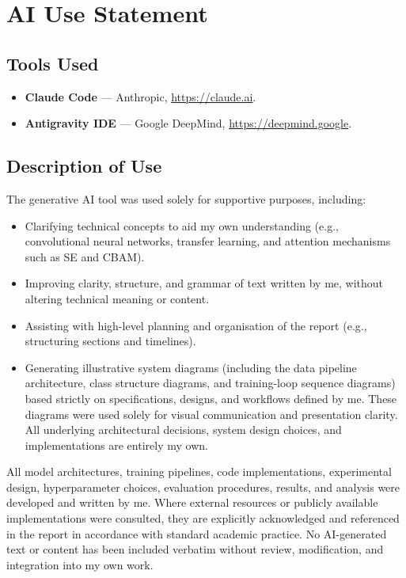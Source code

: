 \documentclass[oneside,openany]{final_report}
\begin{document}
\chapter{AI Use Statement}

\section*{Tools Used}

\begin{itemize}
    \item \textbf{Claude Code} --- Anthropic, \url{https://claude.ai}.
    \item \textbf{Antigravity IDE} --- Google DeepMind, \url{https://deepmind.google}.
\end{itemize}

\section*{Description of Use}

The generative AI tool was used solely for supportive purposes, including:
\begin{itemize}
    \item Clarifying technical concepts to aid my own understanding (e.g., convolutional neural networks, transfer learning, and attention mechanisms such as SE and CBAM).
    \item Improving clarity, structure, and grammar of text written by me, without altering technical meaning or content.
    \item Assisting with high-level planning and organisation of the report (e.g., structuring sections and timelines).
    \item Generating illustrative system diagrams (including the data pipeline architecture, class structure diagrams, and training-loop sequence diagrams) based strictly on specifications, designs, and workflows defined by me. These diagrams were used solely for visual communication and presentation clarity. All underlying architectural decisions, system design choices, and implementations are entirely my own.
\end{itemize}

All model architectures, training pipelines, code implementations, experimental design, hyperparameter choices, evaluation procedures, results, and analysis were developed and written by me. Where external resources or publicly available implementations were consulted, they are explicitly acknowledged and referenced in the report in accordance with standard academic practice. No AI-generated text or content has been included verbatim without review, modification, and integration into my own work.
\end{document}
